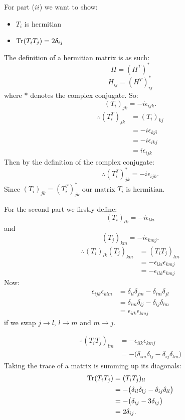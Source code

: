 \begin{enumerate}
    \newpage

    For part ($ii$) we want to show:
    \begin{itemize}
        \item $T_i$ is hermitian

        \item $\Tr(T_iT_j)=2\delta_{ij}$ \\
    \end{itemize}

    The definition of a hermitian matrix is as such:
    $$H=(H^T)^*$$
    $$H_{ij}=(H^T)^*_{ij}$$
    where $*$ denotes the complex conjugate. So:
    $$(T_i)_{jk}=-i\epsilon_{ijk}.$$
    \begin{align*}
        \therefore (T^T_i)_{jk}
        &=(T_i)_{kj} \\
        &=-i\epsilon_{kji} \\
        &=-i\epsilon_{ikj} \\
        &=i\epsilon_{ijk}
    \end{align*}
    Then by the definition of the complex conjugate:
    $$\therefore (T^T_i)^*_{jk}=-i\epsilon_{ijk}.$$
    Since $(T_i)_{jk}=(T^T_i)^*_{jk}$ our matrix $T_i$ is hermitian.

    For the second part we firstly define:
    $$(T_i)_{lk}=-i\epsilon_{lki}$$
    and
    $$(T_j)_{km}=-i\epsilon_{kmj}.$$
    \begin{align*}
        \therefore(T_i)_{lk}(T_j)_{km}
        &=(T_iT_j)_{lm} \\
        &=-\epsilon_{lki}\epsilon_{kmj} \\
        &=-\epsilon_{ilk}\epsilon_{kmj}
    \end{align*}
    Now:
    \begin{align*}
        \epsilon_{ijk}\epsilon_{klm}
        &=\delta_{il}\delta_{jm}-\delta_{im}\delta_{jl} \\
        &=\delta_{im}\delta_{lj}-\delta_{ij}\delta_{lm} \\
        &=\epsilon_{ilk}\epsilon_{kmj}
    \end{align*}
    if we swap $j\rightarrow l$, $l\rightarrow m$ and $m\rightarrow j$.

    \newpage

    \begin{align*}
        \therefore(T_iT_j)_{lm}
        &=-\epsilon_{ilk}\epsilon_{kmj} \\
        &=-\bigl(\delta_{im}\delta_{lj}-\delta_{ij}\delta_{lm}\bigl)
    \end{align*}
    Taking the trace of a matrix is summing up its diagonals:
    \begin{align*}
        \Tr(T_iT_j)
        &=(T_iT_j)_{ll} \\
        &=-\bigl(\delta_{il}\delta_{lj}-\delta_{ij}\delta_{ll}\bigl) \\
        &=-\bigl(\delta_{ij}-3\delta_{ij}\bigl) \\
        &=2\delta_{ij}.
    \end{align*}


\end{enumerate}
